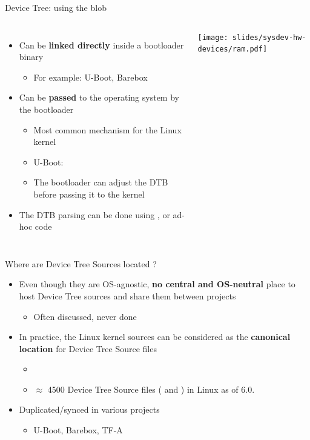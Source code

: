 \begin{frame}{Device Tree: using the blob}
  \begin{columns}
    \begin{itemize}
    \item Can be {\bf linked directly} inside a bootloader binary
      \begin{itemize}
      \item For example: U-Boot, Barebox
      \end{itemize}
    \item Can be {\bf passed} to the operating system by the bootloader
      \begin{itemize}
      \item Most common mechanism for the Linux kernel
      \item U-Boot: 
      \item The bootloader can adjust the DTB before passing it to the
        kernel
      \end{itemize}
    \item The DTB parsing can be done using , or ad-hoc
      code
    \end{itemize}
    \texttt{[image: slides/sysdev-hw-devices/ram.pdf]}
  \end{columns}
\end{frame}

\begin{frame}{Where are Device Tree Sources located ?}
  \begin{itemize}
  \item Even though they are OS-agnostic, {\bf no central and
      OS-neutral} place to host Device Tree sources and share them
    between projects
    \begin{itemize}
    \item Often discussed, never done
    \end{itemize}
  \item In practice, the Linux kernel sources can be considered as the
    {\bf canonical location} for Device Tree Source files
    \begin{itemize}
    \item {}
    \item $\approx$ 4500 Device Tree Source files ( and
          ) in Linux as of 6.0.
    \end{itemize}
  \item Duplicated/synced in various projects
    \begin{itemize}
    \item U-Boot, Barebox, TF-A
    \end{itemize}
  \end{itemize}
\end{frame}

